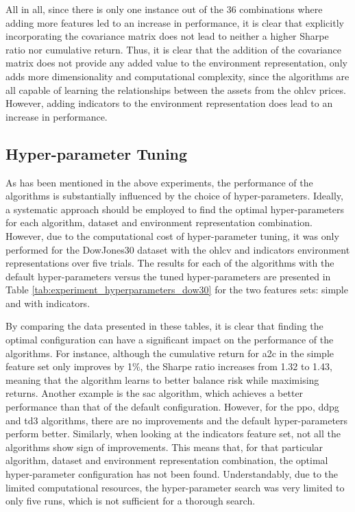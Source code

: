 All in all, since there is only one instance out of the 36 combinations where adding more features led to an increase in performance, it is clear that explicitly incorporating the covariance matrix does not lead to neither a higher Sharpe ratio nor cumulative return. Thus, it is clear that the addition of the covariance matrix does not provide any added value to the environment representation, only adds more dimensionality and computational complexity, since the algorithms are all capable of learning the relationships between the assets from the \acrshort{ohlcv} prices. However, adding indicators to the environment representation does lead to an increase in performance.

\subsection{Hyper-parameter Tuning} \label{sec:hyper-parameter-tuning}

As has been mentioned in the above experiments, the performance of the algorithms is substantially influenced by the choice of hyper-parameters. Ideally, a systematic approach should be employed to find the optimal hyper-parameters for each algorithm, dataset and environment representation combination. However, due to the computational cost of hyper-parameter tuning, it was only performed for the DowJones30 dataset with the \acrshort{ohlcv} and indicators environment representations over five trials. The results for each of the algorithms with the default hyper-parameters versus the tuned hyper-parameters are presented in Table \ref{tab:experiment_hyperparameters_dow30} for the two features sets: simple and with indicators.



By comparing the data presented in these tables, it is clear that finding the optimal configuration can have a significant impact on the performance of the algorithms. For instance, although the cumulative return for \acrshort{a2c} in the simple feature set only improves by 1\%, the Sharpe ratio increases from 1.32 to 1.43, meaning that the algorithm learns to better balance risk while maximising returns. Another example is the \acrshort{sac} algorithm, which achieves a better performance than that of the default configuration. However, for the \acrshort{ppo}, \acrshort{ddpg} and \acrshort{td3} algorithms, there are no improvements and the default hyper-parameters perform better. Similarly, when looking at the indicators feature set, not all the algorithms show sign of improvements. This means that, for that particular algorithm, dataset and environment representation combination, the optimal hyper-parameter configuration has not been found. Understandably, due to the limited computational resources, the hyper-parameter search was very limited to only five runs, which is not sufficient for a thorough search.


